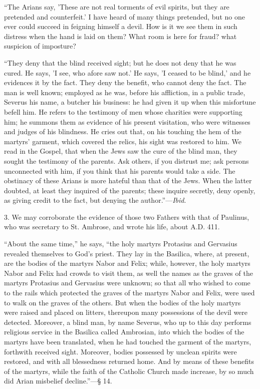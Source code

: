 ``The Arians say, 'These are not real torments of evil spirits,
but they are pretended and counterfeit.' I have heard of many things
pretended, but no one ever could succeed in feigning himself a devil.
How is it we see them in such distress when the hand is laid on them?
What room is here for fraud? what suspicion of imposture?

``They deny that the blind received sight; but he does not deny
that he was cured. He says, 'I see, who afore saw not.' He says, 'I
ceased to be blind,' and he evidences it by the fact. They deny the
benefit, who cannot deny the fact. The man is well known; employed as
he was, before his affliction, in a public trade, Severus his name, a
butcher his business: he had given it up when this misfortune befell
him. He refers to the testimony of men whose charities were supporting
him; he summons them as evidence of his present visitation, who were
witnesses and judges of his blindness. He cries out that, on his
touching the hem of the martyrs' garment, which covered the relics,
his sight was restored to him. We read in the Gospel, that when the
Jews saw the cure of the blind man, they sought the testimony of the
parents. Ask others, if you distrust me; ask persons unconnected with
him, if you think that his parents would take a side. The obstinacy of
these Arians is more hateful than that of the Jews. When the latter
doubted, at least they inquired of the parents; these inquire
secretly, deny openly, as giving credit to the fact, but denying the
author.''—\emph{Ibid}.

3. We may corroborate the evidence of those two Fathers with that
of Paulinus, who was secretary to St. Ambrose, and wrote his life,
about A.D. 411.

``About the same time,'' he says, ``the holy martyrs
Protasius and Gervasius revealed themselves to God's priest. They lay
in the Basilica, where, at present, are the bodies of the martyrs
Nabor and Felix; while, however, the holy martyrs Nabor and Felix had
crowds to visit them, as well the names as the graves of the martyrs Protasius and Gervasius were unknown; so that all who wished to come
to the rails which protected the graves of the martyrs Nabor and
Felix, were used to walk on the graves of the others. But when the
bodies of the holy martyrs were raised and placed on litters,
thereupon many possessions of the devil were detected. Moreover, a
blind man, by name Severus, who up to this day performs religious
service in the Basilica called Ambrosian, into which the bodies of the
martyrs have been translated, when he had touched the garment of the
martyrs, forthwith received sight. Moreover, bodies possessed by
unclean spirits were restored, and with all blessedness returned home.
And by means of these benefits of the martyrs, while the faith of the
Catholic Church made increase, by so much did Arian misbelief
decline.''—§ 14.

